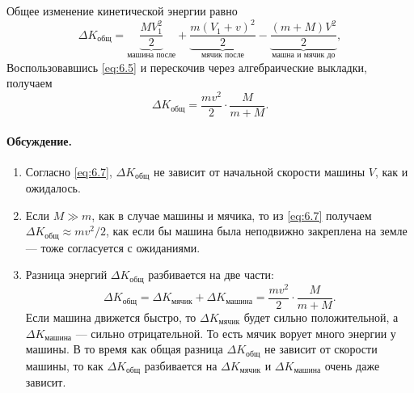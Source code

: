 Общее изменение кинетической энергии равно
\begin{equation}
\Delta K_{\text{общ}}
=
\underbrace{\frac{MV_1^{2}}{2}}_{\text{машина после}}
+
\underbrace{\frac{m(V_1+v)^{2}}{2}}_{\text{мячик после}}
-
\underbrace{\frac{(m+M)V^{2}}{2}}_{\text{машна и мячик до}},
\label{eq:6.6}
\end{equation}
Воспользовавшись \eqref{eq:6.5} и перескочив через алгебраические выкладки, получаем
\begin{equation}
\Delta K_{\text{общ}} = \frac{m v^{2}}2\cdot\frac M{m+M}.
\label{eq:6.7}
\end{equation}

\paragraph{Обсуждение.}
\begin{enumerate}
\item Согласно \eqref{eq:6.7}, $\Delta K_{\text{общ}}$ не зависит от начальной скорости машины $V$, как и ожидалось.

\item Если $M \gg m$, как в случае машины и мячика, то из \eqref{eq:6.7} получаем
$\Delta K_{\text{общ}} \approx  m v^2/2$,
как если бы машина была неподвижно закреплена на земле — тоже согласуется с ожиданиями.

\item Разница энергий $\Delta K_{\text{общ}}$ разбивается на две части:
\[
\Delta K_{\text{общ}} = \Delta K_{\text{мячик}} + \Delta K_{\text{машина}}
= \frac{m v^{2}}2\cdot\frac M{m+M}.
\]
Если машина движется быстро, то $\Delta K_{\text{мячик}}$ будет сильно положительной,
а $\Delta K_{\text{машина}}$ — сильно отрицательной.
То есть мячик ворует много энергии у машины.
В то время как общая разница $\Delta K_{\text{общ}}$ не зависит от скорости машины,
то как $\Delta K_{\text{общ}}$ разбивается на $\Delta K_{\text{мячик}}$ и $\Delta K_{\text{машина}}$ очень даже зависит.
\end{enumerate}
\label{end:Мячик из машины}
